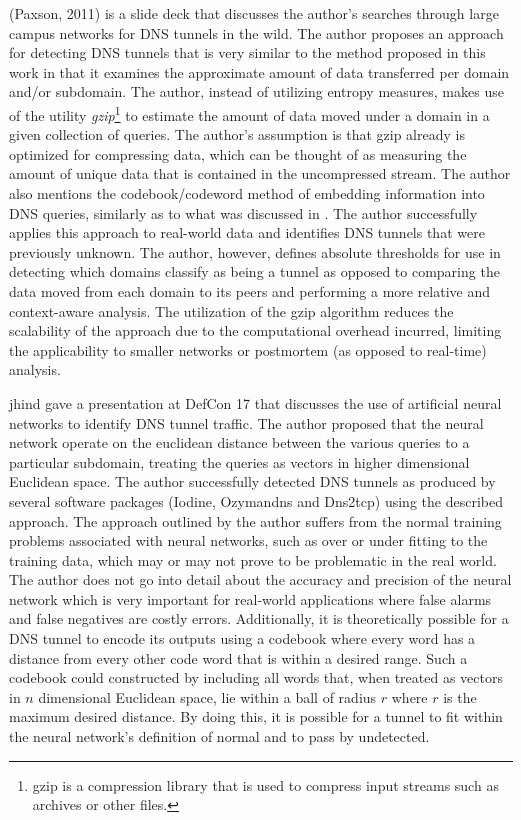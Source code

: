 \documentclass[12pt]{report}
\theoremstyle{remark}
\theoremstyle{definition}
\theoremstyle{definition}
\theoremstyle{definition}
\begin{document}
(Paxson, 2011)\cite{Paxson2011} is a slide deck that discusses the author's
searches through large campus networks for DNS tunnels in the wild. The author
proposes an approach for detecting DNS tunnels that is very similar to the
method proposed in this work in that it examines the approximate amount of data
transferred per domain and/or subdomain. The author, instead of utilizing
entropy measures, makes use of the utility \emph{gzip}\footnote{gzip is a
compression library that is used to compress input streams such as archives or
other files.} to estimate the amount of data moved under a domain in a given
collection of queries. The author's assumption is that gzip already is optimized
for compressing data, which can be thought of as measuring the amount of unique
data that is contained in the uncompressed stream. The author also mentions the
codebook/codeword method of embedding information into DNS queries, similarly as
to what was discussed in \cite{Butler2011}. The author successfully applies this
approach to real-world data and identifies DNS tunnels that were previously
unknown. The author, however, defines absolute thresholds for use in detecting
which domains classify as being a tunnel as opposed to comparing the data moved
from each domain to its peers and performing a more relative and context-aware
analysis. The utilization of the gzip algorithm reduces the scalability of the
approach due to the computational overhead incurred, limiting the applicability
to smaller networks or postmortem (as opposed to real-time) analysis.

jhind\cite{jhind2009} gave a presentation at DefCon 17 that discusses the use of
artificial neural networks to identify DNS tunnel traffic. The author proposed
that the neural network operate on the euclidean distance between the various
queries to a particular subdomain, treating the queries as vectors in higher
dimensional Euclidean space. The author successfully detected DNS tunnels as
produced by several software packages (Iodine, Ozymandns and Dns2tcp) using the
described approach. The approach outlined by the author suffers from the normal
training problems associated with neural networks, such as over or under fitting
to the training data, which may or may not prove to be problematic in the real
world. The author does not go into detail about the accuracy and precision of
the neural network which is very important for real-world applications where
false alarms and false negatives are costly errors. Additionally, it is
theoretically possible for a DNS tunnel to encode its outputs using a codebook
where every word has a distance from every other code word that is within a
desired range. Such a codebook could constructed by including all words that,
when treated as vectors in $n$ dimensional Euclidean space, lie within a ball of
radius $r$ where $r$ is the maximum desired distance. By doing this, it is
possible for a tunnel to fit within the neural network's definition of normal
and to pass by undetected.
\end{document}
